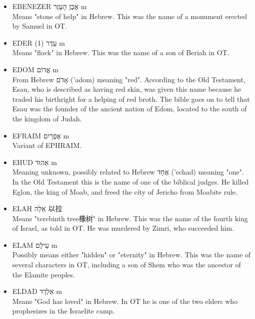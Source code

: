 \begin{itemize} 
\itemsep-.25em
\item {EBENEZER אֶבֶן הָעָזֶר m}\\
Means "stone of help" in Hebrew. This was the name of a monument erected by Samuel in OT. 

\item {EDER (1) עֵדֶר m}\\
Means "flock" in Hebrew. This was the name of a son of Beriah in OT.


\item {EDOM אֱדוֹם m}\\
From Hebrew אָדֹם ('adom) meaning "red". According to the Old Testament, Esau, who is described as having red skin, was given this name because he traded his birthright for a helping of red broth. The bible goes on to tell that Esau was the founder of the ancient nation of Edom, located to the south of the kingdom of Judah.

\item {EFRAIM אֶפְרָיִם m}\\
Variant of EPHRAIM.

\item {EHUD אֵהוּד m}\\
Meaning unknown, possibly related to Hebrew אֶחָד ('echad) meaning "one". In the Old Testament this is the name of one of the biblical judges. He killed Eglon, the king of Moab, and freed the city of Jericho from Moabite rule.

\item {ELAH אֵלָה 以拉}\\
Means "terebinth tree橡树" in Hebrew. This was the name of the fourth king of Israel, as told in OT. He was murdered by Zimri, who succeeded him.

\item {ELAM עֵילָם m}\\
Possibly means either "hidden" or "eternity" in Hebrew. This was the name of several characters in OT, including a son of Shem who was the ancestor of the Elamite peoples.

\item {ELDAD אֵלְדָד m}\\
Means "God has loved" in Hebrew. In OT he is one of the two elders who prophesizes in the Israelite camp.


\end{itemize}
